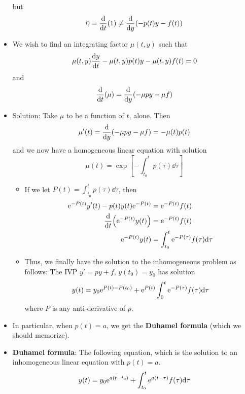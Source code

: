 \documentclass[../notes.tex]{subfiles}
\begin{document}
\begin{itemize}
    but
    \begin{equation*}
        0 = \dv{t}(1) \neq \dv{y}(-p(t)y-f(t))
    \end{equation*}
    \item We wish to find an integrating factor $\mu(t,y)$ such that
    \begin{equation*}
        \mu(t,y)\dv{y}{t}-\mu(t,y)p(t)y-\mu(t,y)f(t) = 0
    \end{equation*}
    and
    \begin{equation*}
        \dv{t}(\mu) = \dv{y}(-\mu py-\mu f)
    \end{equation*}
    \item Solution: Take $\mu$ to be a function of $t$, alone. Then
    \begin{equation*}
        \mu'(t) = \dv{y}(-\mu py-\mu f) = -\mu(t)p(t)
    \end{equation*}
    and we now have a homogeneous linear equation with solution
    \begin{equation*}
        \mu(t) = \exp[-\int_{t_0}^tp(\tau)\dd\tau]
    \end{equation*}
    \begin{itemize}
        \item If we let $P(t)=\int_{t_0}^tp(\tau)\dd\tau$, then
        \begin{align*}
            \e[-P(t)]y'(t)-p(t)y(t)\e[-P(t)] &= \e[-P(t)]f(t)\\
            \dv{t}(\e[-P(t)]y(t)) &= \e[-P(t)]f(t)\\
            \e[-P(t)]y(t) &= \int_{t_0}^t\e[-P(\tau)]f(\tau)\dd\tau
        \end{align*}
        \item Thus, we finally have the solution to the inhomogeneous problem as follows: The IVP $y'=py+f$, $y(t_0)=y_0$ has solution
        \begin{equation*}
            y(t) = y_0\e[P(t)-P(t_0)]+\e[P(t)]\int_0^t\e[-P(\tau)]f(\tau)\dd\tau
        \end{equation*}
        where $P$ is any anti-derivative of $p$.
    \end{itemize}
    \item In particular, when $p(t)=a$, we get the \textbf{Duhamel formula} (which we should memorize).
    \item \textbf{Duhamel formula}: The following equation, which is the solution to an inhomogeneous linear equation with $p(t)=a$.
    \begin{equation*}
        y(t) = y_0\e[a(t-t_0)]+\int_{t_0}^t\e[a(t-\tau)]f(\tau)\dd\tau

\end{equation*}
\end{itemize}
\end{document}
